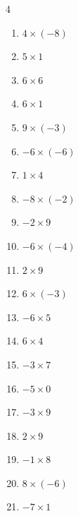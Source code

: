 \begin{multicols}{4}
\begin{enumerate}
  \item $4\times (-8)$
        \phantom{$=-32$}

\columnbreak %

  \item $5\times 1$
        \phantom{$=5$}

  \item $6\times 6$
        \phantom{$=36$}

  \item $6\times 1$
        \phantom{$=6$}

  \item $9\times (-3)$
        \phantom{$=-27$}

  \item $-6\times (-6)$
        \phantom{$=36$}

  \item $1\times 4$
        \phantom{$=4$}

  \item $-8\times (-2)$
        \phantom{$=16$}

  \item $-2\times 9$
        \phantom{$=-18$}

  \item $-6\times (-4)$
        \phantom{$=24$}

  \item $2\times 9$
        \phantom{$=18$}

  \item $6\times (-3)$
        \phantom{$=-18$}

  \item $-6\times 5$
        \phantom{$=-30$}

  \item $6\times 4$
        \phantom{$=24$}

  \item $-3\times 7$
        \phantom{$=-21$}

  \item $-5\times 0$
        \phantom{$=0$}

  \item $-3\times 9$
        \phantom{$=-27$}

  \item $2\times 9$
        \phantom{$=18$}

  \item $-1\times 8$
        \phantom{$=-8$}

  \item $8\times (-6)$
        \phantom{$=-48$}

  \item $-7\times 1$
        \phantom{$=-7$}


\end{enumerate}
\end{multicols}
